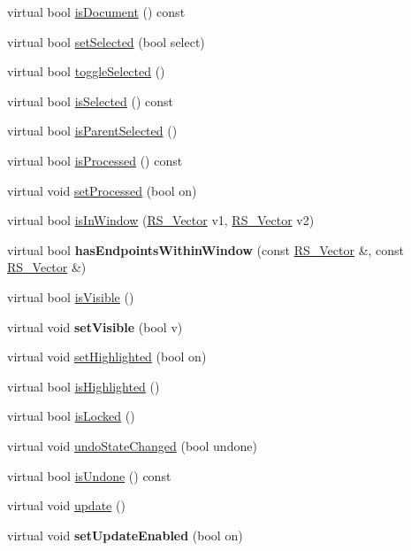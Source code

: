\begin{DoxyCompactItemize}
virtual bool \hyperlink{classRS__Entity_a707a0ce416c9321d20005409e476f7da}{is\-Document} () const 
\item 
virtual bool \hyperlink{classRS__Entity_ac15848f14472a3bb4c89cbc8bfc2d433}{set\-Selected} (bool select)
\item 
virtual bool \hyperlink{classRS__Entity_a081a51200c578213ccd4961818c8c51e}{toggle\-Selected} ()
\item 
virtual bool \hyperlink{classRS__Entity_a2f30188addeef225ad80799fd6d918b1}{is\-Selected} () const 
\item 
virtual bool \hyperlink{classRS__Entity_adc2aeb863f62fd9560ab82453ff3d5a8}{is\-Parent\-Selected} ()
\item 
virtual bool \hyperlink{classRS__Entity_a11cc73b6c779c6b5aa21f31d6216b64a}{is\-Processed} () const 
\item 
virtual void \hyperlink{classRS__Entity_a20facc1c293d3c129454448e6b8a0e71}{set\-Processed} (bool on)
\item 
virtual bool \hyperlink{classRS__Entity_aa9db7dc85991b6c7c3a7e941ae341ee8}{is\-In\-Window} (\hyperlink{classRS__Vector}{R\-S\-\_\-\-Vector} v1, \hyperlink{classRS__Vector}{R\-S\-\_\-\-Vector} v2)
\item 
\hypertarget{classRS__Entity_abd909a2ee8892d2085ed5719da7a086e}{virtual bool {\bfseries has\-Endpoints\-Within\-Window} (const \hyperlink{classRS__Vector}{R\-S\-\_\-\-Vector} \&, const \hyperlink{classRS__Vector}{R\-S\-\_\-\-Vector} \&)}\label{classRS__Entity_abd909a2ee8892d2085ed5719da7a086e}

\item 
virtual bool \hyperlink{classRS__Entity_ac6966ba9c0005d3eab69e42ed1a81df2}{is\-Visible} ()
\item 
\hypertarget{classRS__Entity_acd5003def05192ad771d2748083108a2}{virtual void {\bfseries set\-Visible} (bool v)}\label{classRS__Entity_acd5003def05192ad771d2748083108a2}

\item 
virtual void \hyperlink{classRS__Entity_ab8289176dc68693b5f0ca2f40c64dad4}{set\-Highlighted} (bool on)
\item 
virtual bool \hyperlink{classRS__Entity_ae3e7546384c1fdbcd1e932df58873ae5}{is\-Highlighted} ()
\item 
virtual bool \hyperlink{classRS__Entity_ab53afc719cb83dcc22c33021a1217a5e}{is\-Locked} ()
\item 
virtual void \hyperlink{classRS__Entity_a1c8984b044120833c2089c19fac68bcf}{undo\-State\-Changed} (bool undone)
\item 
virtual bool \hyperlink{classRS__Entity_a6a45b22292f81d60bc98002abdc6561b}{is\-Undone} () const 
\item 
virtual void \hyperlink{classRS__Entity_a018828249d58b2f610f01c726a3c4fdc}{update} ()
\item 
\hypertarget{classRS__Entity_a4415833bd1f3f5d21c7ced13c0940282}{virtual void {\bfseries set\-Update\-Enabled} (bool on)}\label{classRS__Entity_a4415833bd1f3f5d21c7ced13c0940282}


\end{DoxyCompactItemize}
